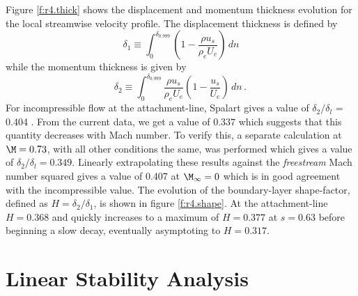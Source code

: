Figure \ref{f:r4.thick} shows the displacement and momentum thickness
evolution for the local streamwise velocity profile.  The displacement
thickness is defined by
%
\begin{equation}
  \delta_1 \equiv \int_0^{\delta_{0.999}} \left( 1 - 
  \frac{ \rho u_s }{\rho_e U_e } \right) \, dn
\end{equation}
%
while the momentum thickness is given by
%
\begin{equation}
  \delta_2 \equiv \int_0^{\delta_{0.999}} \frac{ \rho u_s }{\rho_e U_e} 
                           \left( 1 - \frac{u_s}{U_e} \right) \, dn \period
\end{equation}
%
For incompressible flow at the attachment-line, Spalart gives a value of
$\delta_2 / \delta_l $ = 0.404 \cite{Spalart:89}.  From the current data, we
get a value of $0.337$ which suggests that this quantity decreases with Mach
number.  To verify this, a separate calculation at $\M=0.73$, with all other
conditions the same, was performed which gives a value of $\delta_2/\delta_l =
0.349$.  Linearly extrapolating these results against the {\it freestream}
Mach number squared gives a value of 0.407 at $\M_\infty = 0$ which is in good
agreement with the incompressible value.  The evolution of the boundary-layer
shape-factor, defined as $H = \delta_2 / \delta_1$, is shown in figure
\ref{f:r4.shape}.  At the attachment-line $H = 0.368$ and quickly increases to
a maximum of $H = 0.377$ at $s = 0.63$ before beginning a slow decay,
eventually asymptoting to $H = 0.317$.


\section{Linear Stability Analysis \label{s:LSTpcyl} }

